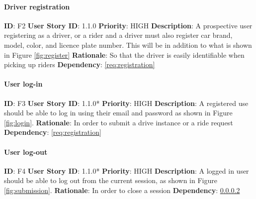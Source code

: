 \documentclass{article}
\begin{document}
\paragraph{Driver registration}\label{req:driverRegistration}
\textbf{ID}: F2\newline
\textbf{User Story ID}: 1.1.0\newline
\textbf{Priority}: HIGH\newline
\textbf{Description}: A prospective user registering as a driver, or a rider and a driver must also register car brand, model, color, and licence plate number. This will be in addition to what is shown in Figure \ref{fig:register}\newline
\textbf{Rationale}: So that the driver is easily identifiable when picking up riders\newline
\textbf{Dependency}: \ref{req:registration}\newline

\paragraph{User log-in}\label{req:log-in}
\textbf{ID}: F3\newline
\textbf{User Story ID}: 1.1.0*\newline
\textbf{Priority}: HIGH\newline
\textbf{Description}: A registered use should be able to log in using their email and password as shown in Figure \ref{fig:login}. \newline
\textbf{Rationale}: In order to submit a drive instance or a ride request\newline
\textbf{Dependency}: \ref{req:registration}\newline

\paragraph{User log-out}\label{req:log-out}
\textbf{ID}: F4\newline
\textbf{User Story ID}: 1.1.0*\newline
\textbf{Priority}: HIGH\newline
\textbf{Description}: A logged in user should be able to log out from the current session, as shown in Figure \ref{fig:submission}. \newline
\textbf{Rationale}: In order to close a session\newline
\textbf{Dependency}: \ref{req:log-in}\newline
\end{document}
